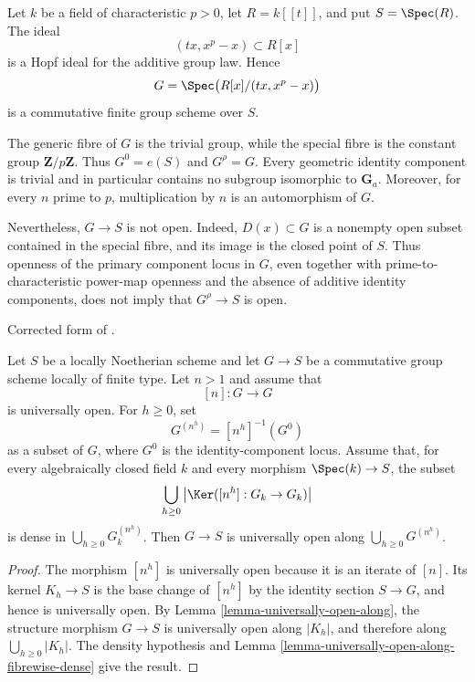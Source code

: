 \begin{example}
\label{example-primary-component-open-not-universally-open}
Let $k$ be a field of characteristic $p>0$, let $R=k[[t]]$, and put
$S=\Spec(R)$. The ideal
$$
(tx,x^p-x)\subset R[x]
$$
is a Hopf ideal for the additive group law. Hence
$$
G=\Spec\bigl(R[x]/(tx,x^p-x)\bigr)
$$
is a commutative finite group scheme over $S$.

The generic fibre of $G$ is the trivial group, while the special fibre is
the constant group $\mathbf Z/p\mathbf Z$. Thus $G^0=e(S)$ and
$G^\rho=G$. Every geometric identity component is trivial and in particular
contains no subgroup isomorphic to $\mathbf G_a$. Moreover, for every $n$
prime to $p$, multiplication by $n$ is an automorphism of $G$.

Nevertheless, $G\to S$ is not open. Indeed, $D(x)\subset G$ is a nonempty
open subset contained in the special fibre, and its image is the closed point
of $S$. Thus openness of the primary component locus in $G$, even together
with prime-to-characteristic power-map openness and the absence of additive
identity components, does not imply that $G^\rho\to S$ is open.
\end{example}

\begin{lemma}
\label{lemma-power-kernel-density-universally-open}
\begin{reference}
Corrected form of \cite[Expos\'e 236, Corollary 1.5, pp. 227--228]{FGA}.
\end{reference}
Let $S$ be a locally Noetherian scheme and let $G \to S$ be a commutative
group scheme locally of finite type. Let $n > 1$ and assume that
$$
[n] : G \longrightarrow G
$$
is universally open. For $h \geq 0$, set
$$
G^{(n^h)} = [n^h]^{-1}(G^0)
$$
as a subset of $G$, where $G^0$ is the identity-component locus. Assume that,
for every algebraically closed field $k$ and every morphism
$\Spec(k) \to S$, the subset
$$
\bigcup_{h \geq 0} \left|\Ker([n^h] : G_k \to G_k)\right|
$$
is dense in $\bigcup_{h \geq 0}G^{(n^h)}_k$. Then $G \to S$ is universally
open along $\bigcup_{h \geq 0}G^{(n^h)}$.
\end{lemma}

\begin{proof}
The morphism $[n^h]$ is universally open because it is an iterate of $[n]$.
Its kernel $K_h \to S$ is the base change of $[n^h]$ by the identity section
$S \to G$, and hence is universally open. By
Lemma \ref{lemma-universally-open-along}, the structure morphism $G \to S$
is universally open along $|K_h|$, and therefore along
$\bigcup_{h \geq 0}|K_h|$. The density hypothesis and
Lemma \ref{lemma-universally-open-along-fibrewise-dense} give the result.
\end{proof}

